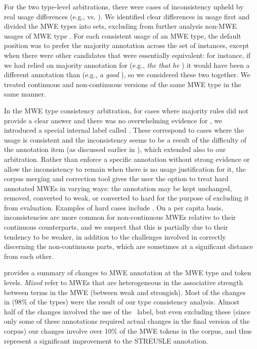 \documentclass[output=paper,modfonts,nonflat]{langsci/langscibook}
\begin{document}
For the two type-level arbitrations, there were cases of inconsistency upheld by real usage differences (e.g.,  vs. ). We identified clear differences in usage first and divided the MWE types into sets, excluding from further analysis non-MWE usages of MWE type \ngram[s]. For each consistent usage of an MWE type, the default position was to prefer the majority annotation across the set of instances, except when there were other candidates that were essentially equivalent: for instance, if we had relied on majority annotation for  (e.g., \textit{the  that he }) it would have been a different annotation than  (e.g., \textit{ a good }), so we considered these two together. We treated continuous and non-continuous versions of the same MWE type in the same manner.

In the MWE type consistency arbitration, for cases where majority rules did not provide a clear answer and there was no overwhelming evidence for , we introduced a special internal label called \hard. These correspond to cases where the usage is consistent and the inconsistency seems to be a result of the difficulty of the annotation item (as discussed earlier in ), which extended also to our arbitration. Rather than enforce a specific annotation without strong evidence or allow the inconsistency to remain when there is no usage justification for it, the corpus merging and correction tool gives the user the option to treat hard annotated MWEs in varying ways: the annotation may be kept unchanged, removed, converted to weak, or converted to hard for the purpose of excluding it from evaluation. Examples of hard cases include . On a per capita basis, inconsistencies are more common for non-continuous MWEs relative to their continuous counterparts, and we suspect that this is partially due to their tendency to be weaker, in addition to the challenges involved in correctly discerning the non-continuous parts, which are sometimes at a significant distance from each other. 

 provides a summary of changes to MWE annotation at the MWE type and token levels.  \textit{Mixed} refer to MWEs that are heterogeneous in the associative strength between terms in the MWE (between weak and strongish). Most of the changes in  (98\% of the types) were the result of our type consistency analysis. Almost half of the changes involved the use of the \hard~label, but even excluding these (since only some of these annotations required actual changes in the final version of the corpus) our changes involve over 10\% of the MWE tokens in the corpus, and thus represent a significant improvement to the STREUSLE annotation.  
\end{document}
